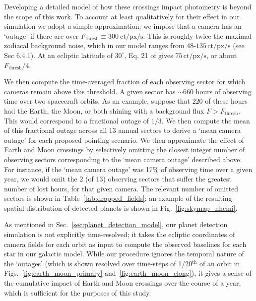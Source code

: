 Developing a detailed model of how these crossings impact \tesss photometry is beyond the scope of this work.
To account at least qualitatively for their effect in our simulation we adopt a 
simple approximation: we impose that a camera has an `outage' if there are over 
$F_\text{thresh}\equiv300\ \text{ct/px/s}$.
This is roughly twice the maximal zodiacal background noise, which in our model 
ranges from $48$-$135\,\mathrm{ct/px/s}$ (see  Sec 
6.4.1). At an ecliptic latitude of $30^\circ$, Eq. 21 of 
 gives $75\,\mathrm{ct/px/s}$, or about 
$F_\mathrm{thresh}/4$.

We then compute the time-averaged fraction of each observing sector for which \tesss cameras remain above this threshold. 
A given sector has $\sim660$ hours of observing time over two spacecraft orbits.
As an example, suppose that $220$ of these hours had the Earth, the Moon, or both shining with a background flux $F > F_\text{thresh}$. 
This would correspond to a fractional outage of $1/3$. 
We then compute the mean of this fractional outage across all 13 annual sectors to derive a `mean camera outage' for each proposed pointing scenario.
We then approximate the effect of Earth and Moon crossings by selectively 
omitting the closest integer number of observing sectors corresponding to the 
`mean camera outage' described above.
For instance, if the `mean camera outage' was 17\% of \tesss observing time over a given year, we would omit the 2 (of 13) observing sectors that suffer the greatest number of lost hours, for that given camera.
The relevant number of omitted sectors is shown in Table~\ref{tab:dropped_fields}; an example of the resulting spatial distribution of detected planets is shown in Fig.~\ref{fig:skymap_nhemi}.


As mentioned in Sec.~\ref{sec:planet_detection_model}, our planet detection 
simulation is not explicitly time-resolved; it takes the ecliptic coordinates 
of camera fields for each orbit as input to compute the observed baselines for 
each star in our galactic model.
While our procedure ignores the temporal nature of the `outages' (which is 
shown resolved over time-steps of 1/20$^\mathrm{th}$ of an orbit in 
Figs.~\ref{fig:earth_moon_primary} and~\ref{fig:earth_moon_elong}), it gives a 
sense of the cumulative impact of Earth and Moon crossings over 
the course of a year, which is sufficient for the purposes of this study.

